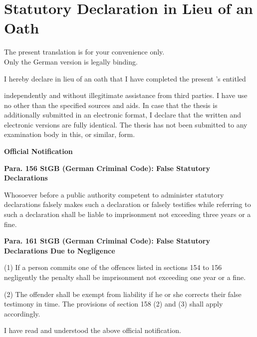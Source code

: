 \chapter*{Statutory Declaration in Lieu of an Oath}
\thispagestyle{empty}
\begin{small}
\noindent The present translation is for your convenience only.\\
\noindent Only the German version is legally binding.
\vspace{2\baselineskip}

\noindent I hereby declare in lieu of an oath that I have completed the present \THESISTYPE's entitled
\begin{center}
  \TITLEENG
\end{center}
\noindent independently and without illegitimate assistance from third parties. I have use no other than the specified sources and aids. In case that the thesis is additionally submitted in an electronic format, I declare that the written and electronic versions are fully identical. The thesis has not been submitted to any examination body in this, or similar, form.

\vfill
\noindent \textbf{Official Notification}
\vspace{1\baselineskip}

\noindent \textbf{Para. 156 StGB (German Criminal Code): False Statutory Declarations}

\noindent Whosoever before a public authority competent to administer statutory declarations falsely makes such a declaration or falsely testifies while referring to such a declaration shall be liable to imprisonment not exceeding three years or a fine.
\vspace{1\baselineskip}

\noindent \textbf{Para. 161 StGB (German Criminal Code): False Statutory Declarations Due to Negligence}

\noindent (1) If a person commits one of the offences listed in sections 154 to 156 negligently the penalty shall be imprisonment not exceeding one year or a fine.

\noindent (2) The offender shall be exempt from liability if he or she corrects their false testimony in time. The provisions of section 158 (2) and (3) shall apply accordingly.
\vspace{1\baselineskip}

\noindent I have read and understood the above official notification.
\end{small} 